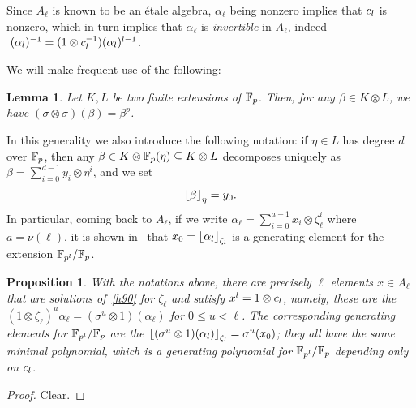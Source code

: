 \documentclass{sig-alternate}
\newtheorem{proposition}[theorem]{Proposition}
\newtheorem{lemma}[theorem]{Lemma}
\begin{document}
Since $A_\ell$ is known to be an \'etale algebra, 
$\alpha_\ell$ being nonzero implies that $c_l$ is nonzero, which in turn implies
that $\alpha_\ell$ is \emph{invertible} in $A_\ell$, indeed $\;(\alpha_l)^{-1} = (1\otimes c_l^{-1})(\alpha_l)^{l-1}$.


We will make frequent use of the following:
\begin{lemma}
\label{FrobFrob}
Let $K,L$ be two finite extensions of $\mathbb{F}_{p}$.
Then, for any $\beta\in K\otimes L$,
we have $(\sigma\otimes\sigma)(\beta)=\beta^p$.
\end{lemma}
In this generality we also introduce the following notation: if $\eta\in L$ has degree $d$ over $\mathbb{F}_{p}$,
then any $\beta\in K\otimes\mathbb{F}_{p}(\eta)\subseteq K\otimes L$ decomposes uniquely as $\beta = \sum_{i =  0}^{d-1}y_i\otimes\eta^i$,
and we set  \[ \left\lfloor \beta \right\rfloor_{\eta}=y_0. \]
In particular, coming back to $A_\ell$, if we write
$\alpha_\ell = \sum_{i =  0}^{a-1}x_i\otimes\zeta_{\ell}^i$ where $a=\nu(\ell)$,
it is shown in~\cite{Allombert02} that $x_0=\left\lfloor \alpha_l \right\rfloor_{\zeta_l}$ is a generating element for the extension
$\mathbb{F}_{p^l}/\mathbb{F}_{p}$.

\begin{proposition}
\label{depend}
With the notations above, there are precisely $\ell$ elements $x\in A_\ell$ that are solutions of~\eqref{h90} for $\zeta_\ell$
and satisfy $x^l=1\otimes c_l$, namely, these are the $(1\otimes\zeta_\ell)^u\alpha_\ell=(\sigma^u\otimes 1)(\alpha_\ell)$
for $0\leq u<\ell$.
The corresponding generating elements for $\mathbb{F}_{p^l}/\mathbb{F}_{p}$ are the $\left\lfloor (\sigma^u\otimes 1)(\alpha_l) \right\rfloor_{\zeta_l}=\sigma^u(x_0)$;
they all have the same minimal polynomial, which is a generating polynomial for $\mathbb{F}_{p^l}/\mathbb{F}_{p}$ depending only on $c_l$.
\end{proposition}
\begin{proof}
Clear.
\end{proof}
\end{document}
